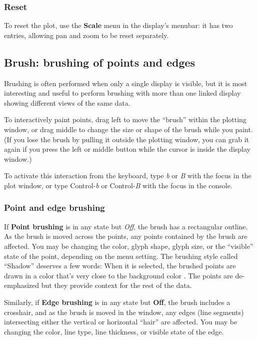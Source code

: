 \documentclass[11pt]{article}
\def\Widget#1{\textbf{#1}}
\begin{document}
\subsubsection{Reset}

To reset the plot, use the \Widget{Scale} menu in the display's menubar:
it has two entries, allowing pan and zoom to be reset separately.

\subsection{Brush: brushing of points and edges}
\label{slbl:Brush}

Brushing is often performed when only a single display is visible,
but it is most interesting and useful to perform brushing with more
than one linked display showing different views of the same data.  

To interactively paint points, drag left to move the ``brush'' within
the plotting window, or drag middle to change the size or shape of
the brush while you paint.  (If you lose the brush by pulling it
outside the plotting window, you can grab it again if you press the
left or middle button while the cursor is inside the display window.)

To activate this interaction from the keyboard, type {\em b} or
{\em B} with the focus in the plot window, or type Control-{\em b} or
Control-{\em B} with the focus in the console.

\subsubsection{Point and edge brushing}
%
If \Widget{Point brushing} is in any state but {\it Off}, the brush has a
rectangular outline.  As the brush is moved across the points, any
points contained by the brush are affected.  You may be changing the
color, glyph shape, glyph size, or the ``visible'' state of the point,
depending on the menu setting.  The brushing style called ``Shadow''
deserves a few words: When it is selected, the brushed points are
drawn in a color that's very close to the background color
\cite{BeckerCleveland87}.  The points are de-emphasized but they
provide context for the rest of the data.

Similarly, if \Widget{Edge brushing} is in any state but \Widget{Off},
the brush includes a crosshair, and as the brush is moved in the
window, any edges (line segments) intersecting either the vertical or
horizontal ``hair'' are affected.  You may be changing the color, line
type, line thickness, or visible state of the edge.
\end{document}
